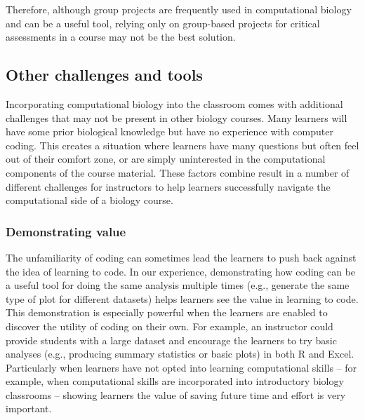 Therefore, although group projects are frequently used in computational biology and can be a useful tool, relying only on group-based projects for critical assessments in a course may not be the best solution.



\subsection{Other challenges and tools}

Incorporating computational biology into the classroom comes with additional challenges that may not be present in other biology courses.
Many learners will have some prior biological knowledge but have no experience with computer coding.
This creates a situation where learners have many questions but often feel out of their comfort zone, or are simply uninterested in the computational components of the course material.
These factors combine result in a number of different challenges for instructors to help learners successfully navigate the computational side of a biology course.

\subsubsection{Demonstrating value}
The unfamiliarity of coding can sometimes lead the learners to push back against the idea of learning to code.
In our experience, demonstrating how coding can be a useful tool for doing the same analysis multiple times (e.g., generate the same type of plot for different datasets) helps learners see the value in learning to code. 
This demonstration is especially powerful when the learners are enabled to discover the utility of coding on their own. 
For example, an instructor could provide students with a large dataset and encourage the learners to try basic analyses (e.g., producing summary statistics or basic plots) in both R and Excel. 
Particularly when learners have not opted into learning computational skills -- for example, when computational skills are incorporated into introductory biology classrooms -- showing learners the value of saving future time and effort is very important. 


